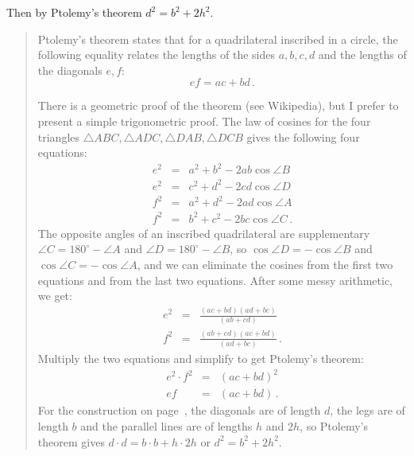 \documentclass[11pt,a4paper]{article}
\begin{document}
Then by Ptolemy’s theorem $d^2 = b^2 + 2h^2$.
\begin{quote}
Ptolemy's theorem states that for a quadrilateral inscribed in a circle, the following equality relates the lengths of the sides $a,b,c,d$ and the lengths of the diagonals $e,f$:
\[
ef = ac + bd\,.
\]
\begin{center}
\end{center}
There is a geometric proof of the theorem (see Wikipedia), but I prefer to present a simple trigonometric proof. The law of cosines for the four triangles $\triangle ABC, \triangle ADC, \triangle DAB, \triangle DCB$ gives the following four equations:
\begin{eqnarray*}
e^2 &=& a^2 + b^2 - 2ab \cos \angle B\\
e^2 &=& c^2 + d^2 - 2cd \cos \angle D\\
f^2 &=& a^2 + d^2 - 2ad \cos \angle A\\
f^2 &=& b^2 + c^2 - 2bc \cos \angle C\,.
\end{eqnarray*}
The opposite angles of an inscribed quadrilateral are supplementary $\angle C = 180^\circ - \angle A$ and $\angle D = 180^\circ - \angle B$, so $\cos \angle D = - \cos \angle B$ and $\cos \angle C = -\cos \angle A$, and we can eliminate the cosines from the first two equations and from the last two equations. After some messy arithmetic, we get:
\begin{eqnarray*}
e^2 &=& \frac{(ac+bd)(ad+bc)}{(ab+cd)}\\
f^2 &=& \frac{(ab+cd)(ac+bd)}{(ad+bc)}\,.
\end{eqnarray*}
Multiply the two equations and simplify to get Ptolemy's theorem:
\begin{eqnarray*}
e^2\cdot f^2 &=& (ac+bd)^2\\
ef &=& (ac+bd)\,. 
\end{eqnarray*}
For the construction on page~\pageref{ptolemy}, the diagonals are of length $d$, the legs are of length $b$ and the parallel lines are of lengths $h$ and $2h$, so Ptolemy's theorem gives $d\cdot d = b\cdot b + h\cdot 2h$ or $d^2=b^2+2h^2$.
\end{quote}
\end{document}
